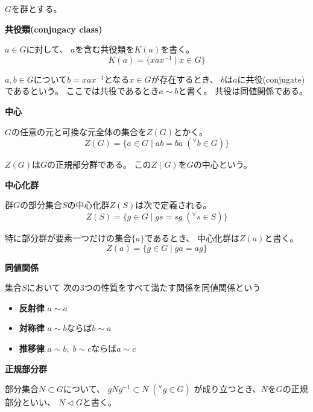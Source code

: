 \documentclass[12pt,b5paper]{ltjsarticle}
\begin{document}
\hrulefill

$G$を群とする。

\textbf{共役類(conjugacy class)}

$a\in G$に対して、
$a$を含む共役類を$K(a)$を書く。
\begin{equation}
 K(a) = \{xax^{-1} \mid x\in G \}
\end{equation}

$a,b \in G$について$b=xax^{-1}$となる$x\in G$が存在するとき、
$b$は$a$に共役(conjugate)であるという。
ここでは共役であるとき$a\sim b$と書く。
共役は同値関係である。

\dotfill

\textbf{中心}

$G$の任意の元と可換な元全体の集合を$Z(G)$とかく。
\begin{equation}
 Z(G) = \{ a\in G \mid ab = ba \; ({}^{\forall}b\in G) \}
\end{equation}

$Z(G)$は$G$の正規部分群である。
この$Z(G)$を$G$の中心という。

\dotfill

\textbf{中心化群}

群$G$の部分集合$S$の中心化群$Z(S)$は次で定義される。
\begin{equation}
 Z(S) = \{ g\in G \mid gs=sg \; ({}^{\forall}s\in S)\}
\end{equation}

特に部分群が要素一つだけの集合$\{a\}$であるとき、
中心化群は$Z(a)$と書く。
\begin{equation}
 Z(a) = \{ g\in G \mid ga=ag \}
\end{equation}

\dotfill

\textbf{同値関係}

集合$S$において
次の3つの性質をすべて満たす関係を同値関係という
\begin{itemize}
 \item \textbf{反射律} $a\sim a$
 \item \textbf{対称律} $a\sim b$ならば$b\sim a$
 \item \textbf{推移律} $a\sim b,\; b\sim c$ならば$a\sim c$
\end{itemize}


\dotfill

\textbf{正規部分群}

部分集合$N \subset G$について、
$gNg^{-1} \subset N \; ({}^{\forall}g\in G)$
が成り立つとき、$N$を$G$の正規部分といい、
$N\triangleleft G$と書く。
\end{document}
